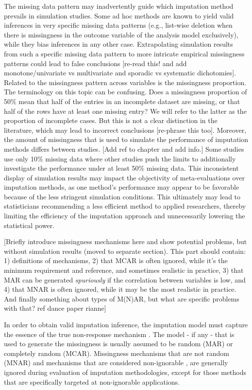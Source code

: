 \documentclass[bimj,fleqn]{w-art}
\begin{document}
The missing data pattern may inadvertently guide which imputation method prevails in simulation studies. Some ad hoc methods are known to yield valid inferences in very specific missing data patterns (e.g., list-wise deletion when there is missingness in the outcome variable of the analysis model exclusively), while they bias inferences in any other case. Extrapolating simulation results from such a specific missing data pattern to more intricate empirical missingness patterns could lead to false conclusions [re-read this! and add monotone/univariate vs multivariate and sporadic vs systematic dichotomies]. Related to the missingness pattern across variables is the missingness proportion. The terminology on this topic can be confusing. Does a missingness proportion of 50\% mean that half of the entries in an incomplete dataset are missing, or that half of the rows have at least one missing entry? We will refer to the latter as the proportion of incomplete cases. But this is not a clear distinction in the literature, which may lead to incorrect conclusions [re-phrase this too]. Moreover, the amount of missingness that is used to simulate the performance of imputation methods differs between studies. [Add ref to chapter \citep{liu21} and add info.] Some studies use only 10\% missing data where other studies push the limits to additionally investigate the performance under at least 50\% missing data. This inconsistent display of simulation results may impact the objectivity of meta-evaluations over imputation methods, as one method's performance may appear to be favorable because of the less stringent simulation conditions. This ultimately may lead to statisticians recommending a less efficient method to applied researchers, thereby limiting the efficiency of the imputation approach and unnecessarily lowering the statistical power.

[Briefly introduce missingness mechanisms here and show potential problems, but without simulation results (moved to separate section). This part should contain: 1) definitions of mechanisms, 2) that MCAR is often ignored, while it's the minimum requirement and reference, and sometimes realistic in practice, 3) that MAR can be generated \emph{spuriously} if the correlation between variables is low, and 4) that MNAR is often ignored, while it may be the most realistic in practice. And finally something about types of M(N)AR, but what are specific problems with that? ref dance paper rianne]

In order to obtain valid imputation inference, the imputation model must capture the essence of the true non-response mechanism \citep{meng94}. The model - if any - that is used to generate the missingness is usually assumed to be random (MAR) or completely random (MCAR). Missingness mechanisms that are not random (MNAR) and mechanisms that are considered non-ignorable \citep[see e.g.][]{rubi76}, are generally ignored during evaluation of imputation methodologies, except for those methods that are specifically targeted at non-ignorable applications.
\end{document}
